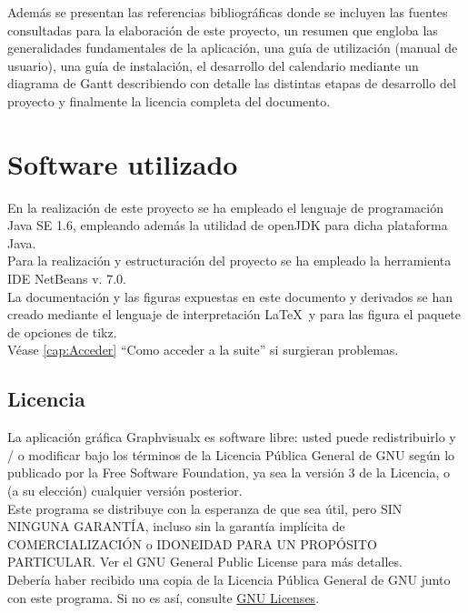 Además se presentan las referencias bibliográficas donde se incluyen las fuentes consultadas para la elaboración de este proyecto, un resumen que engloba las generalidades fundamentales de la aplicación, una guía de utilización (manual de usuario), una guía de instalación, el desarrollo del calendario mediante un diagrama de Gantt describiendo con detalle las distintas etapas de desarrollo del proyecto y finalmente la licencia completa del documento. \\

\section{Software utilizado}

En la realización de este proyecto se ha empleado el lenguaje de programación Java SE 1.6, empleando además la utilidad de openJDK para dicha plataforma Java.\\

Para la realización y estructuración del proyecto se ha empleado la herramienta IDE NetBeans v. 7.0. \\

La documentación y las figuras expuestas en este documento y derivados se han creado mediante el lenguaje de interpretación \LaTeX\ y para las figura el paquete de opciones de tikz.\\

Véase \ref{cap:Acceder} ``Como acceder a la suite''  si surgieran problemas.

\subsection{Licencia} 

La aplicación gráfica Graphvisualx es software libre: usted puede redistribuirlo y / o modificar bajo los términos de la Licencia Pública General de GNU según lo publicado por la Free Software Foundation, ya sea la versión 3 de la Licencia, o (a su elección) cualquier versión posterior.\\

Este programa se distribuye con la esperanza de que sea útil, pero SIN NINGUNA GARANTÍA, incluso sin la garantía implícita de COMERCIALIZACIÓN o IDONEIDAD PARA UN PROPÓSITO PARTICULAR. Ver el GNU General Public License para más detalles.\\

Debería haber recibido una copia de la Licencia Pública General de GNU junto con este programa. Si no es así, consulte \href{http://www.gnu.org/licenses/}{GNU Licenses}.\\